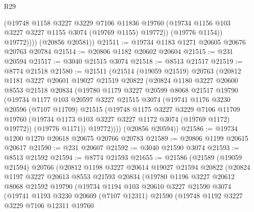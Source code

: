 \begin{lexlean}{R29}
\begin{coremodule}
                (@19748
                  @1158
                  @3227
                  @3229
                  @7106
                  @11836
                  @19760
                  (@19734 @1156 @103 @3227 @3227 @1155 @3074 (@19769 @1155) @19772))
                (@19776 @1154))
              @19772))))
      (@20856 @20581))
@21511 := @19734 @1183 @1271 @20605 @20676 @20763 @20784
@21514 := @20806 @1182 @20602 @20604
@21515 := @231 @20594
@21517 := @3040 @21515 @3074
@21518 := @8513 @21517
@21519 := @8774 @21518
@21580 := @21511
    (@21514
      (@19059 @21519)
      @20763
      (@20812
        @1181
        @3227
        @20601
        @19027
        @21519
        @20822
        (@20824
          @1180
          @3227
          @20600
          @8553
          @21518
          @20834
          (@19780
            @1179
            @3227
            @20599
            @8068
            @21517
            @19790
            (@19734
              @1177
              @103
              @20597
              @3227
              @21515
              @3074
              (@19741
                @1176
                @3230
                @20596
                (@7107 @11709)
                @21515
                (@19748
                  @1175
                  @3227
                  @3229
                  @7106
                  @11709
                  @19760
                  (@19734 @1173 @103 @3227 @3227 @1172 @3074 (@19769 @1172) @19772))
                (@19776 @1171))
              @19772))))
      (@20856 @20594))
@21586 := @19734 @1200 @1270 @20618 @20675 @20766 @20783
@21589 := @20806 @1199 @20615 @20617
@21590 := @231 @20607
@21592 := @3040 @21590 @3074
@21593 := @8513 @21592
@21594 := @8774 @21593
@21655 := @21586
    (@21589
      (@19059 @21594)
      @20766
      (@20812
        @1198
        @3227
        @20614
        @19027
        @21594
        @20822
        (@20824
          @1197
          @3227
          @20613
          @8553
          @21593
          @20834
          (@19780
            @1196
            @3227
            @20612
            @8068
            @21592
            @19790
            (@19734
              @1194
              @103
              @20610
              @3227
              @21590
              @3074
              (@19741
                @1193
                @3230
                @20609
                (@7107 @12311)
                @21590
                (@19748
                  @1192
                  @3227
                  @3229
                  @7106
                  @12311
                  @19760

\end{coremodule}
\end{lexlean}
